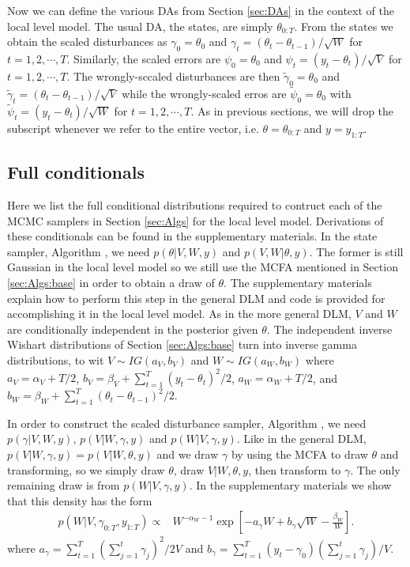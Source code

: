 \documentclass{article}
\begin{document}
Now we can define the various DAs from Section \ref{sec:DAs} in the context of the local level model. The usual DA, the states, are simply $\theta_{0:T}$. From the states we obtain the scaled disturbances as $\gamma_0=\theta_0$ and $\gamma_t = (\theta_t - \theta_{t-1})/\sqrt{W}$ for $t=1,2,\cdots,T$. Similarly, the scaled errors are $\psi_0=\theta_0$ and $\psi_t = (y_t - \theta_t)/\sqrt{V}$ for $t=1,2,\cdots,T$. The wrongly-sccaled disturbances are then $\tilde{\gamma}_{0}=\theta_0$ and $\tilde{\gamma}_t = (\theta_t - \theta_{t-1})/\sqrt{V}$ while the wrongly-scaled erros are $\tilde{\psi}_0=\theta_0$ with $\tilde{\psi}_t = (y_t - \theta_t)/\sqrt{W}$ for $t=1,2,\cdots,T$. As in previous sections, we will drop the subscript whenever we refer to the entire vector, i.e. $\theta=\theta_{0:T}$ and $y=y_{1:T}$.

\subsection{Full conditionals}\label{sec:LLM:fullcond}

Here we list the full conditional distributions required to contruct each of the MCMC samplers in Section \ref{sec:Algs} for the local level model. Derivations of these conditionals can be found in the supplementary materials. In the state sampler, Algorithm , we need $p(\theta|V,W,y)$ and $p(V,W|\theta,y)$. The former is still Gaussian in the local level model so we still use the MCFA mentioned in Section \ref{sec:Algs:base} in order to obtain a draw of $\theta$. The supplementary materials explain how to perform this step in the general DLM and code is provided for accomplishing it in the local level model. As in the more general DLM, $V$ and $W$ are conditionally independent in the posterior given $\theta$. The independent inverse Wishart distributions of Section \ref{sec:Algs:base} turn into inverse gamma distributions, to wit $V\sim IG(a_V,b_V)$  and $W\sim IG(a_W, b_W)$ where $a_V = \alpha_V + T/2$, $b_V = \beta_V + \sum_{t=1}^T(y_t - \theta_t)^2/2$, $a_W = \alpha_W + T/2$, and $b_W = \beta_W + \sum_{t=1}^T(\theta_t - \theta_{t-1})^2/2$.

In order to construct the scaled disturbance sampler, Algorithm , we need $p(\gamma|V,W,y)$, $p(V|W,\gamma,y)$ and $p(W|V,\gamma,y)$. Like in the general DLM, $p(V|W,\gamma,y)=p(V|W,\theta,y)$ and we draw $\gamma$ by using the MCFA to draw $\theta$ and transforming, so we simply draw $\theta$, draw $V|W,\theta,y$, then transform to $\gamma$. The only remaining draw is from $p(W|V,\gamma,y)$. In the supplementary materials we show that this density has the form
\begin{align*}
p(W|V,\gamma_{0:T},y_{1:T}) \propto& W^{-\alpha_W - 1}\exp\left[-a_\gamma W + b_\gamma \sqrt{W} -\frac{\beta_W}{W}\right]. 
\end{align*}
where $a_\gamma =\sum_{t=1}^T(\sum_{j=1}^t\gamma_j)^2/2V$ and $b_\gamma =\sum_{t=1}^T(y_t-\gamma_0)(\sum_{j=1}^t\gamma_j)/V$. 
\end{document}
